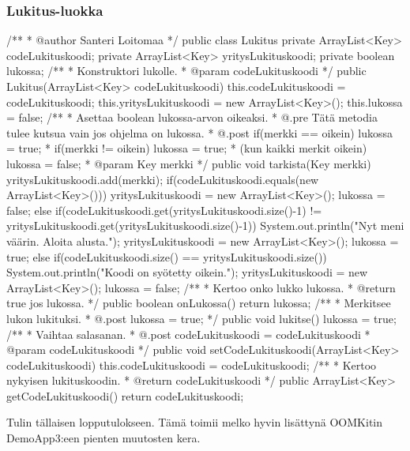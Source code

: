 \subsubsection{Lukitus-luokka}
\label{Lukitus-luokka}
\begin{javacode}
/**
 * @author Santeri Loitomaa
 */
public class Lukitus {
  private ArrayList<Key> codeLukituskoodi;
  private ArrayList<Key> yritysLukituskoodi;
  private boolean lukossa;
  /**
   * Konstruktori lukolle.
   * @param codeLukituskoodi
   */
  public Lukitus(ArrayList<Key> codeLukituskoodi) {
    this.codeLukituskoodi = codeLukituskoodi;
    this.yritysLukituskoodi = new ArrayList<Key>();
    this.lukossa = false;
  }
  /**
   * Asettaa boolean lukossa-arvon oikeaksi.
   * @.pre Tätä metodia tulee kutsua vain jos ohjelma on lukossa.
   * @.post   if(merkki == oikein) lukossa = true;
   *       if(merkki != oikein) lukossa = true;
   *       (kun kaikki merkit oikein) lukossa = false;
   * @param Key merkki
   */
  public void tarkista(Key merkki){
    yritysLukituskoodi.add(merkki);
    if(codeLukituskoodi.equals(new ArrayList<Key>())) {
      yritysLukituskoodi = new ArrayList<Key>();
      lukossa = false;
    }
    else if(codeLukituskoodi.get(yritysLukituskoodi.size()-1) !=
        yritysLukituskoodi.get(yritysLukituskoodi.size()-1)) {
      System.out.println("Nyt meni väärin. Aloita alusta.");
      yritysLukituskoodi = new ArrayList<Key>();
      lukossa = true;
    }
    else if(codeLukituskoodi.size() == yritysLukituskoodi.size()) {
      System.out.println("Koodi on syötetty oikein.");
      yritysLukituskoodi = new ArrayList<Key>();
      lukossa = false;
    }
  }
  /**
   * Kertoo onko lukko lukossa.
   * @return true jos lukossa.
   */
  public boolean onLukossa() {
    return lukossa;
  }
  /**
   * Merkitsee lukon lukituksi.
   * @.post lukossa = true;
   */
  public void lukitse() {
    lukossa = true;
  }
  /**
   * Vaihtaa salasanan.
   * @.post codeLukituskoodi = codeLukituskoodi
   * @param codeLukituskoodi
   */
  public void setCodeLukituskoodi(ArrayList<Key> codeLukituskoodi) {
    this.codeLukituskoodi = codeLukituskoodi;
  }
  /**
   * Kertoo nykyisen lukituskoodin.
   * @return codeLukituskoodi
   */
  public ArrayList<Key> getCodeLukituskoodi(){
    return codeLukituskoodi;
  }
}
\end{javacode}

Tulin tällaisen lopputulokseen. Tämä toimii melko hyvin lisättynä OOMKitin DemoApp3:een pienten muutosten kera.

\pagebreak

